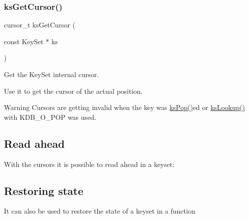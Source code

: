 \subsubsection{\texorpdfstring{ksGetCursor()}{ksGetCursor()}}
{\footnotesize\ttfamily cursor\+\_\+t ks\+Get\+Cursor (\begin{DoxyParamCaption}\item[{const Key\+Set $\ast$}]{ks }\end{DoxyParamCaption})}



Get the Key\+Set internal cursor. 

Use it to get the cursor of the actual position.

\begin{DoxyWarning}{Warning}
Cursors are getting invalid when the key was \mbox{\hyperlink{group__keyset_gae42530b04defb772059de0600159cf69}{ks\+Pop()}}ed or \mbox{\hyperlink{group__keyset_gaa34fc43a081e6b01e4120daa6c112004}{ks\+Lookup()}} with K\+D\+B\+\_\+\+O\+\_\+\+P\+OP was used.
\end{DoxyWarning}
\hypertarget{group__keyset_readahead}{}\subsection{Read ahead}\label{group__keyset_readahead}
With the cursors it is possible to read ahead in a keyset\+:


\begin{DoxyCode}{0}
\DoxyCodeLine{\{}
\DoxyCodeLine{        \textcolor{comment}{// now mark this key}}
\DoxyCodeLine{}
\DoxyCodeLine{        \textcolor{comment}{//code..}}
\DoxyCodeLine{        \textcolor{comment}{// use ksCurrent(ks) to check the keys}}
\DoxyCodeLine{        \textcolor{comment}{//code..}}
\DoxyCodeLine{}
\DoxyCodeLine{        \textcolor{comment}{// jump back to the position marked before}}
\DoxyCodeLine{\}}
\end{DoxyCode}
\hypertarget{group__keyset_restore}{}\subsection{Restoring state}\label{group__keyset_restore}
It can also be used to restore the state of a keyset in a function


